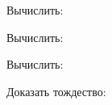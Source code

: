 \begin{listofex}
	\item {}
	\item Вычислить:
	\begin{enumcols}[itemcolumns=1]
		\item {}
		\item {}
	\end{enumcols}
	\item Вычислить:
	\begin{enumcols}[itemcolumns=2]
		\item {}
		\item {}
		\item {}
	\end{enumcols}
	\item Вычислить:
	\begin{enumcols}[itemcolumns=2]
		\item {}
		\item {}
		\item {}
	\end{enumcols}
	\item Доказать тождество:
	\begin{enumcols}[itemcolumns=2]
		\item {}
		\item {}
		\item {}
	\end{enumcols}
	\item {}
\end{listofex}
